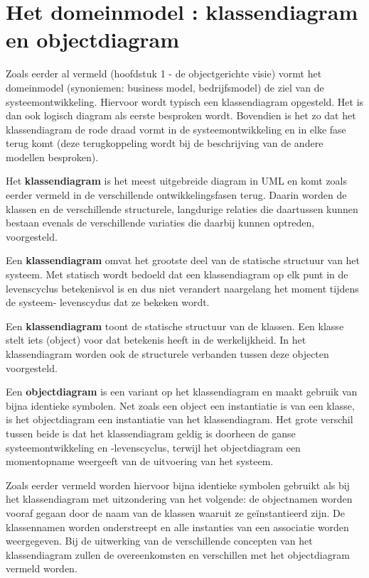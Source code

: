 \section{Het domeinmodel : klassendiagram en objectdiagram}

Zoals eerder al vermeld (hoofdstuk 1 - de objectgerichte visie) vormt het domeinmodel (synoniemen: business model, bedrijfsmodel) de ziel van de systeemontwikkeling. Hiervoor wordt typisch een klassendiagram opgesteld. Het is dan ook logisch diagram als eerste besproken wordt. Bovendien is het zo dat het klassendiagram de rode draad vormt in de systeemontwikkeling en in elke fase terug komt (deze terugkoppeling wordt bij de beschrijving van de andere modellen besproken).

Het \textbf{klassendiagram} is het meest uitgebreide diagram in UML en komt zoals eerder vermeld in de verschillende ontwikkelingsfasen terug. Daarin worden de klassen en de verschillende structurele, langdurige relaties die daartussen kunnen bestaan evenals de verschillende variaties die daarbij kunnen optreden, voorgesteld.

Een \textbf{klassendiagram} omvat het grootste deel van de statische structuur van het systeem. Met statisch wordt bedoeld dat een klassendiagram op elk punt in de levenscyclus betekenisvol is en dus niet verandert naargelang het moment tijdens de systeem- levenscydus dat ze bekeken wordt.

Een \textbf{klassendiagram} toont de statische structuur van de klassen. Een klasse stelt iets (object) voor dat betekenis heeft in de werkelijkheid. In het klassendiagram worden ook de structurele verbanden tussen deze objecten voorgesteld.

Een \textbf{objectdiagram} is een variant op het klassendiagram en maakt gebruik van bijna identieke symbolen. Net zoals een object een instantiatie is van een klasse, is het objectdiagram een instantiatie van het klassendiagram.
Het grote verschil tussen beide is dat het klassendiagram geldig is doorheen de ganse systeemontwikkeling en -levenscyclus, terwijl het objectdiagram een momentopname weergeeft van de uitvoering van het systeem.

Zoals eerder vermeld worden hiervoor bijna identieke symbolen gebruikt als bij het klassendiagram met uitzondering van het volgende: de objectnamen worden vooraf gegaan door de naam van de klassen waaruit ze geïnstantieerd zijn. De klassennamen worden onderstreept en alle instanties van een associatie worden weergegeven. Bij de uitwerking van de verschillende concepten van het klassendiagram zullen de overeenkomsten en verschillen met het objectdiagram vermeld worden.

